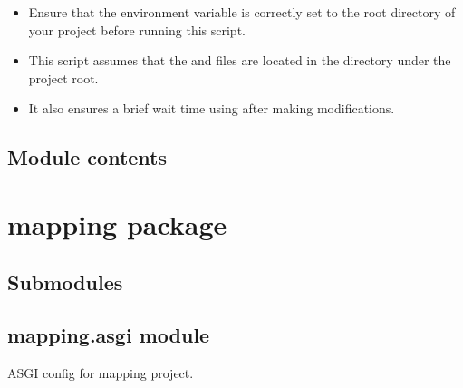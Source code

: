 \documentclass[letterpaper,10pt,english]{sphinxmanual}
\begin{document}
\begin{description}
\begin{itemize}
\item {} 
\sphinxAtStartPar
Ensure that the  environment variable is correctly set to the root directory 
of your project before running this script.

\item {} 
\sphinxAtStartPar
This script assumes that the  and  files are located in the  directory 
under the project root.

\item {} 
\sphinxAtStartPar
It also ensures a brief wait time using  after making modifications.

\end{itemize}

\end{description}


\subsection{Module contents}
\label{\detokenize{generate_documentation:module-generate_documentation}}\label{\detokenize{generate_documentation:module-contents}}
\sphinxstepscope


\section{mapping package}
\label{\detokenize{mapping:mapping-package}}\label{\detokenize{mapping::doc}}

\subsection{Submodules}
\label{\detokenize{mapping:submodules}}

\subsection{mapping.asgi module}
\label{\detokenize{mapping:module-mapping.asgi}}\label{\detokenize{mapping:mapping-asgi-module}}
\sphinxAtStartPar
ASGI config for mapping project.
\end{document}

